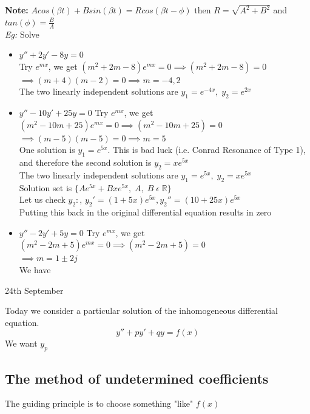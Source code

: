 \documentclass[11pt]{article}
\theoremstyle{definition}
\newcommand{\R}{\mathbb{R}}
\begin{document}
\textbf{Note:} $Acos(\beta t) + B sin(\beta t) = Rcos(\beta t - \phi)$
then $R = \sqrt{A^2 + B^2}$ and $tan(\phi) = \frac{B}{A}$\\
\textit{Eg:} Solve
\begin{itemize}[topsep=-10pt]
    \item $y'' + 2y' -8y = 0$\\
    Try $e^{mx}$, we get $(m^2 + 2m - 8)e^{mx} = 0 \implies (m^2 + 2m - 8) = 0$ \\$\implies (m+4)(m-2) = 0 \implies m = -4, 2$\\
    The two linearly independent solutions are $y_1 = e^{-4x},\; y_2 = e^{2x}$
    \item $y'' - 10y' + 25y = 0$
    Try $e^{mx}$, we get $(m^2 -10m + 25)e^{mx} = 0 \implies (m^2 -10m + 25) = 0$ \\$\implies (m-5)(m-5) = 0 \implies m = 5$\\
    One solution is $y_1 = e^{5x}$. This is bad luck (i.e. Conrad Resonance of Type 1), and therefore the second solution is $y_2 = xe^{5x}$\\
    The two linearly independent solutions are $y_1 = e^{5x},\; y_2 = xe^{5x}$\\
    Solution set is $\{Ae^{5x} + Bxe^{5x},\; A,\; B\; \epsilon\; \R\}$\\
    Let us check $y_2: $, $y_2' = (1+5x)e^{5x}, y_2'' = (10 + 25x)e^{5x}$ \\
    Putting this back in the original differential equation results in zero
    \item $y'' - 2y' + 5y = 0$
    Try $e^{mx}$, we get $(m^2 - 2m + 5)e^{mx} = 0 \implies (m^2 - 2m + 5) = 0$ \\$ \implies m = 1 \pm 2j$\\
    We have

\end{itemize}
\newpage

\begin{center}
    {\LARGE 24th September}\\
\end{center}
Today we consider a particular solution of the inhomogeneous differential equation.
$$y'' + py' + qy = f(x)$$
We want $y_p$
\subsection{The method of undetermined coefficients}
The guiding principle is to choose something "like" $f(x)$
\end{document}
